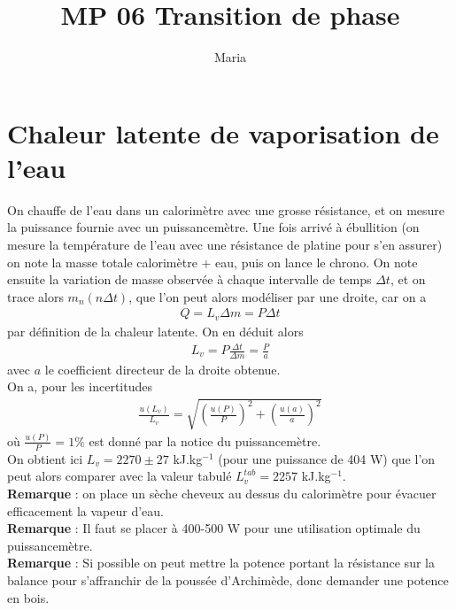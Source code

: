 \documentclass[12pt,prb,aps,epsf]{article}
\begin{document}
	
	\title{MP 06 Transition de phase}
	\author{Maria}
	
	\maketitle
	
	\tableofcontents
	
	\pagebreak
	
	
\section{Chaleur latente de vaporisation de l'eau}
On chauffe de l'eau dans un calorimètre avec une grosse résistance, et on mesure la puissance fournie avec un puissancemètre. Une fois arrivé à ébullition (on mesure la température de l'eau avec une résistance de platine pour s'en assurer) on note la masse totale calorimètre + eau, puis on lance le chrono. On note ensuite la variation de masse observée à chaque intervalle de temps $\Delta t$, et on trace alors $m_n(n\Delta t)$, que l'on peut alors modéliser par une droite, car on a 
\begin{eqnarray}
Q = L_v\Delta m = P \Delta t
\end{eqnarray}
par définition de la chaleur latente. On en déduit alors 
\begin{eqnarray}
L_v = P\frac{\Delta t}{\Delta m} = \frac{P}{a}
\end{eqnarray} 
avec $a$ le coefficient directeur de la droite obtenue.\\
On a, pour les incertitudes 
\begin{eqnarray}
\frac{u(L_v)}{L_v} = \sqrt{\left(\frac{u(P)}{P}\right)^2 + \left(\frac{u(a)}{a}\right)^2}
\end{eqnarray}
où $\frac{u(P)}{P} = 1\%$ est donné par la notice du puissancemètre.\\
On obtient ici $L_v = 2270\pm 27$ kJ.kg$^{-1}$ (pour une puissance de 404 W) que l'on peut alors comparer avec la valeur tabulé $L_v^{tab} = 2257$ kJ.kg$^{-1}$.\\

\textbf{Remarque} : on place un sèche cheveux au dessus du calorimètre pour évacuer efficacement la vapeur d'eau.\\
\textbf{Remarque} : Il faut se placer à 400-500 W pour une utilisation optimale du puissancemètre.\\
\textbf{Remarque} : Si possible on peut mettre la potence portant la résistance sur la balance pour s'affranchir de la poussée d'Archimède, donc demander une potence en bois.
\end{document}
